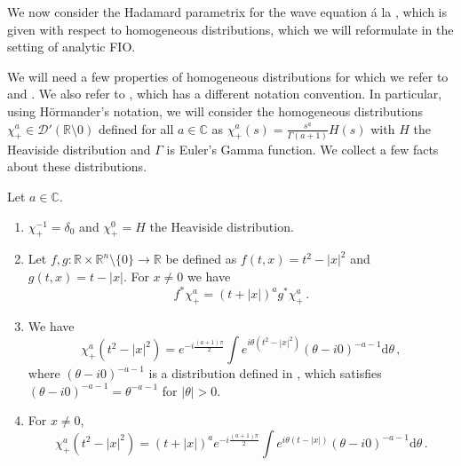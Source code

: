 \documentclass[
	fontsize=11pt, 
	twoside=false, 
	abstract=true, 
	a4paper,
]{scrartcl}
\newcommand{\sem}{\setminus\{0\}}
\newcommand{\RR}{\mathbb{R}}
\newcommand{\CC}{\mathbb{C}}
\newcommand{\DD}{\mathscr{D}}
\newcommand{\dd}{\mathrm{d}}
\newcommand{\abs}[1]{\left\lvert#1\right\rvert}
\begin{document}
We now consider the Hadamard parametrix for the wave equation \'a la \cite[\S~17]{zbMATH05129478}, which is given with respect to homogeneous distributions, which we will reformulate in the setting of analytic FIO. 

We will need a few properties of homogeneous distributions for which we refer to \cite[\S~3.2]{hoermander1} and \cite{MR0166596}. We also refer to \cite{zbMATH05622635}, which has a different notation convention. In particular, using H\"ormander's notation, we will consider the homogeneous distributions $\chi_+^a \in \DD'(\RR\setminus 0)$ defined for all $a\in \mathbb{C}$ as $\chi_+^a(s) = \frac{s^a}{\Gamma(a+1)}H(s)$ with $H$ the Heaviside distribution and $\Gamma$ is Euler's Gamma function. We collect a few facts about these distributions.
\begin{lemma}\label{lem:homdist}
	Let $a\in \CC$.
	\begin{enumerate}
		\item $\chi^{-1}_+ = \delta_0$ and $\chi_+^0 = H$ the Heaviside distribution.
		\item Let $f,g \colon\RR\times \RR^{n}\sem\to \RR$ be defined as $f(t,x) = t^2-\abs{x}^2$ and $g(t,x)=t-\abs{x}$. For $x\neq 0$ we have
			\[
				f^\ast \chi_+^a = (t+\abs{x})^a g^\ast \chi_+^a\,.
			\]
		\item We have
		\[
			\chi^a_+(t^2-\abs{x}^2) = e^{-i\frac{(a+1)\pi}{2}}\int e^{i\theta(t^2-\abs{x}^2)} (\theta-i0)^{-a-1}\dd\theta\,,
		\]
		where $(\theta-i0)^{-a-1}$ is a distribution defined in \cite[\S~3.2]{hoermander1}, which satisfies $(\theta-i0)^{-a-1}= \theta^{-a-1}$ for $\abs{\theta}>0$.
		\item For $x\neq 0$,
			\[
				\chi^a_+(t^2-\abs{x}^2) = (t+\abs{x})^a e^{-i\frac{(a+1)\pi}{2}}\int e^{i\theta(t-\abs{x})} (\theta-i0)^{-a-1}\dd\theta\,.
			\]
	\end{enumerate}
\end{lemma}
\end{document}
